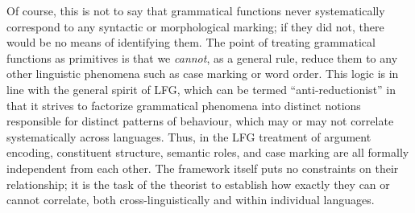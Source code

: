 \documentclass[output=paper]{../langscibook}
\begin{document}
 Of course, this is not to say that grammatical functions never systematically correspond to any syntactic or morphological marking; if they did not, there would be no means of identifying them. The point of treating grammatical functions as primitives is that we \emph{cannot}, as a general rule, reduce them to any other linguistic phenomena such as case marking or word order. This logic is in line with the general spirit of LFG, which can be termed ``anti-reductionist'' in that it strives to factorize grammatical phenomena into distinct notions responsible for distinct patterns of behaviour, which may or may not correlate systematically across languages. Thus, in the LFG treatment of argument encoding, constituent structure, semantic roles, and case marking are all formally independent from each other. The framework itself puts no constraints on their relationship; it is the task of the theorist to establish how exactly they can or cannot correlate, both cross-linguistically and within individual languages.
 
\end{document}
